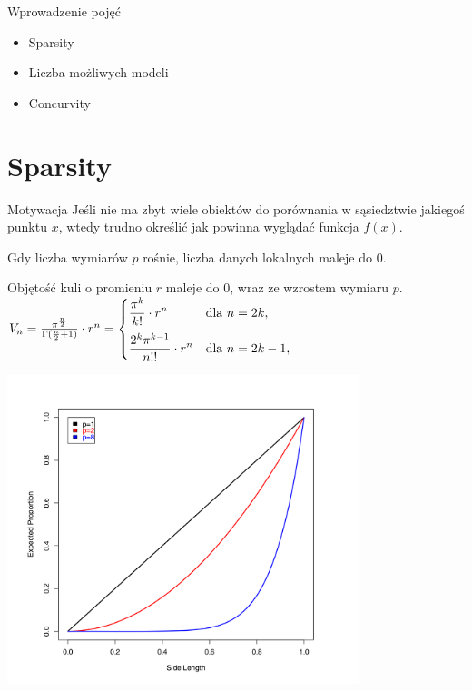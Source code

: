 \documentclass[a4paper]{beamer}
\begin{document}
\begin{frame}
\begin{block}{Wprowadzenie pojęć}
\begin{itemize}
\item Sparsity 
\item Liczba możliwych modeli
\item Concurvity
\end{itemize}
\end{block}

\end{frame}

\section{Sparsity}
\begin{frame}
\begin{block}{Motywacja}
Jeśli nie ma zbyt wiele obiektów do porównania w sąsiedztwie jakiegoś punktu $x$, wtedy trudno określić jak powinna wyglądać funkcja $f(x)$.
\end{block}
\begin{block}{}
Gdy liczba wymiarów $p$ rośnie, liczba danych lokalnych maleje do 0. 
\end{block}
\begin{block}{}
Objętość kuli o promieniu $r$ maleje do 0, wraz ze wzrostem wymiaru $p$. \\
$V_{n}=\frac { \pi^{\frac{n}{2}}}{\Gamma (\frac{n}{2}+1)}\cdot r^{n} = \begin{cases} \displaystyle {\pi^k\over k!}\cdot r^n & \mbox{dla }n=2k, \\[2ex] \displaystyle {2^k \pi^{k-1}\over n!!}\cdot r^n & \mbox{dla } n=2k-1, \end{cases}$
\end{block}
\end{frame}

\begin{frame}

\begin{center}
\includegraphics[height=9cm]{ball.png}
\end{center}
\end{frame}
\end{document}
